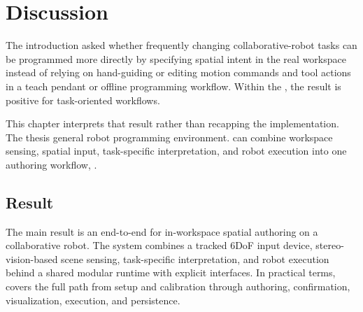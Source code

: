 \chapter{Discussion} \label{chapter:ch6_discussion}

The introduction asked whether frequently changing collaborative-robot tasks can be programmed more directly by specifying spatial intent in the real workspace instead of relying on hand-guiding or editing motion commands and tool actions in a teach pendant or offline programming workflow. Within the \DIFdelbegin {}\DIFdelend \DIFaddbegin {}\DIFaddend , the result is positive for \DIFdelbegin {}\DIFdelend \DIFaddbegin {}\DIFaddend task-oriented workflows.

This chapter interprets that result rather than recapping the implementation. The thesis \DIFdelbegin {}\DIFdelend \DIFaddbegin {}\DIFaddend general robot programming environment. \DIFdelbegin {}\DIFdelend \DIFaddbegin {}\DIFaddend can combine workspace sensing, spatial input, task-specific interpretation, and robot execution into one authoring workflow, \DIFdelbegin {}\DIFdelend \DIFaddbegin {}\DIFaddend .

\section{\DIFdelbegin {}\DIFdelend \DIFaddbegin {}\DIFaddend Result}

The main result is an end-to-end \DIFdelbegin {}\DIFdelend \DIFaddbegin {}\DIFaddend for in-workspace spatial authoring on a collaborative robot. The \DIFdelbegin {}\DIFdelend system combines a tracked 6DoF input device, stereo-vision-based scene sensing, task-specific interpretation, and robot execution behind a shared modular runtime with explicit interfaces. In practical terms, \DIFdelbegin {}\DIFdelend \DIFaddbegin {}\DIFaddend covers the full path from setup and calibration through authoring, confirmation, visualization, execution, and persistence.

